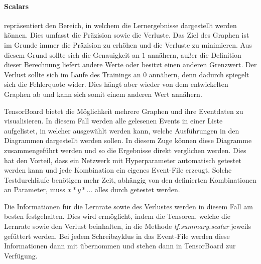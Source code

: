 \paragraph{Scalars} repräsentiert den Bereich, in welchem die Lernergebnisse dargestellt werden können. 
Dies umfasst die Präzision sowie die Verluste. 
Das Ziel des Graphen ist im Grunde immer die Präzision zu erhöhen und die Verluste zu minimieren. 
Aus diesem Grund sollte sich die Genauigkeit an $1$ annähern, außer die Definition dieser Berechnung liefert andere Werte oder besitzt einen anderen Grenzwert. 
Der Verlust sollte sich im Laufe des Trainings an $0$ annähern, denn dadurch spiegelt sich die Fehlerquote wider. 
Dies hängt aber wieder von dem entwickelten Graphen ab und kann sich somit einem anderen Wert annähern.
\phantom \newline

\noindent
TensorBoard bietet die Möglichkeit mehrere Graphen und ihre Eventdaten zu visualisieren. 
In diesem Fall werden alle gelesenen Events in einer Liste aufgelistet, in welcher ausgewählt werden kann, welche Ausführungen in den Diagrammen dargestellt werden sollen. 
In diesem Zuge können diese Diagramme zusammengeführt werden und so die Ergebnisse direkt verglichen werden. 
Dies hat den Vorteil, dass ein Netzwerk mit Hyperparameter automatisch getestet werden kann und jede Kombination ein eigenes Event-File erzeugt. 
Solche Testdurchläufe benötigen mehr Zeit, abhängig von den definierten Kombinationen an Parameter, muss $x * y * ...$ alles durch getestet werden.
\phantom \newline

\noindent
Die Informationen für die Lernrate sowie des Verlustes werden in diesem Fall am besten festgehalten. 
Dies wird ermöglicht, indem die Tensoren, welche die Lernrate sowie den Verlust beinhalten, in die Methode \textit{tf.summary.scalar} jeweils gefüttert werden. 
Bei jedem Schreibzyklus in das Event-File werden diese Informationen dann mit übernommen und stehen dann in TensorBoard zur Verfügung.

